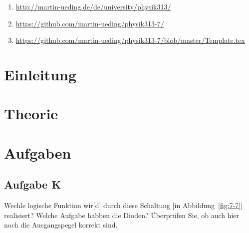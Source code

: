 \begin{enumerate}
	\item
		\label{it:mu}
		\url{http://martin-ueding.de/de/university/physik313/}
	\item
		\label{it:github/alles}
		\url{https://github.com/martin-ueding/physik313-7/}
	\item
		\label{it:github/template}
		\url{https://github.com/martin-ueding/physik313-7/blob/master/Template.tex}
\end{enumerate}

\tableofcontents
\newpage


\FloatBarrier
\section{Einleitung}


\FloatBarrier
\section{Theorie}


\FloatBarrier
\section{Aufgaben}

\FloatBarrier
\subsection{Aufgabe K}

\begin{problem}
	Wechle logische Funktion wir[d] durch diese Schaltung [in
	Abbildung~\ref{fig:7-7}] realisiert? Welche Aufgabe habben die Dioden?
	Überprüfen Sie, ob auch hier noch die Ausgangspegel korrekt sind.
\end{problem}

